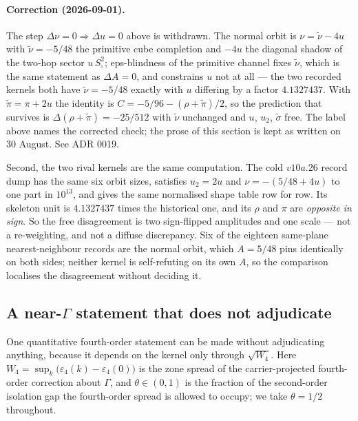 \documentclass[11pt]{article}
\theoremstyle{plain}
\theoremstyle{definition}
\theoremstyle{remark}
\newcommand{\chk}[1]{}
\begin{document}
\paragraph{Correction (2026-09-01).} The step $\Delta\nu=0\Rightarrow\Delta u=0$ above
is withdrawn. The normal orbit is $\nu=\tilde\nu-4u$ with $\tilde\nu=-5/48$ the
primitive cube completion and $-4u$ the diagonal shadow of the two-hop sector
$u\,S_\square^2$; eps-blindness of the primitive channel fixes $\tilde\nu$, which is
the same statement as $\Delta A=0$, and constrains $u$ not at all --- the two
recorded kernels both have $\tilde\nu=-5/48$ exactly with $u$ differing by a factor
$4.1327437$. With $\tilde\pi=\pi+2u$ the identity is $C=-5/96-(\rho+\tilde\pi)/2$, so
the prediction that survives is $\Delta(\rho+\tilde\pi)=-25/512$ with $\tilde\nu$
unchanged and $u$, $u_2$, $\tilde\sigma$ free. The label above names the corrected
check; the prose of this section is kept as written on 30 August. See ADR 0019.

Second, the two rival kernels are the same computation. The cold $v10a.26$
record dump has the same six orbit sizes, satisfies $u_2=2u$ and
$\nu=-(5/48+4u)$ to one part in $10^{13}$, and gives the same normalised shape
table row for row. Its skeleton unit is $4.1327437$ times the historical one,
and its $\rho$ and $\pi$ are \emph{opposite in sign}. So the free disagreement
is two sign-flipped amplitudes and one scale --- not a re-weighting, and not a
diffuse discrepancy. Six of the eighteen same-plane nearest-neighbour records
are the normal orbit, which $A=5/48$ pins identically on both sides; neither
kernel is self-refuting on its own $A$, so the comparison localises the
disagreement without deciding it.
\chk{FINDING: the cold kernel is the same six orbits with rho and pi sign-flipped}

\subsection{A \texorpdfstring{near-$\Gamma$}{near-Gamma} statement that does not adjudicate}

One quantitative fourth-order statement can be made without adjudicating
anything, because it depends on the kernel only through $\sqrt{W_4}$. Here
$W_4=\sup_k\bigl(\varepsilon_4(k)-\varepsilon_4(0)\bigr)$ is the zone spread of
the carrier-projected fourth-order correction about $\Gamma$, and
$\theta\in(0,1)$ is the fraction of the second-order isolation gap the
fourth-order spread is allowed to occupy; we take $\theta=1/2$ throughout.
\end{document}
